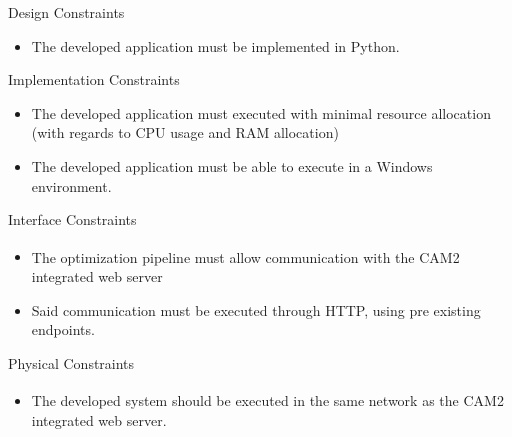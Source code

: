 \documentclass[10pt]{beamer}
\begin{document}
  \begin{frame}{Design Constraints}
    \begin{itemize}
      \item The developed application must be implemented in Python.
    \end{itemize}
  \end{frame}
  \begin{frame}{Implementation Constraints}
    \begin{itemize}
      \item The developed application must executed with minimal resource allocation (with regards to CPU usage and RAM allocation)
      \item The developed application must be able to execute in a Windows environment.
    \end{itemize}
  \end{frame}
  \begin{frame}{Interface Constraints}
    \begin{itemize}
      \item The optimization pipeline must allow communication with the CAM2\textsuperscript{\textregistered} integrated web server
      \item Said communication must be executed through HTTP, using pre existing endpoints.
    \end{itemize}
  \end{frame}
  \begin{frame}{Physical Constraints}
    \begin{itemize}
      \item The developed system should be executed in the same network as the CAM2\textsuperscript{\textregistered} integrated web server.
    \end{itemize}
  \end{frame}
\end{document}
